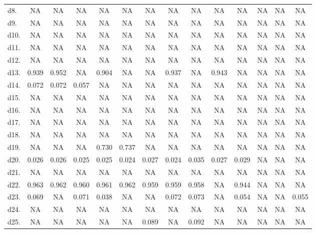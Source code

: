 \begin{table}
\begin{tabular}{lccccccccccccc}
d8.   & NA    & NA    & NA    & NA    & NA    & NA    & NA    & NA    & NA    & NA    & NA    & NA    & NA \\
d9.   & NA    & NA    & NA    & NA    & NA    & NA    & NA    & NA    & NA    & NA    & NA    & NA    & NA \\
d10.  & NA    & NA    & NA    & NA    & NA    & NA    & NA    & NA    & NA    & NA    & NA    & NA    & NA \\
d11.  & NA    & NA    & NA    & NA    & NA    & NA    & NA    & NA    & NA    & NA    & NA    & NA    & NA \\
d12.  & NA    & NA    & NA    & NA    & NA    & NA    & NA    & NA    & NA    & NA    & NA    & NA    & NA \\
d13.  & 0.939 & 0.952 & NA    & 0.904 & NA    & NA    & 0.937 & NA    & 0.943 & NA    & NA    & NA    & NA \\
d14.  & 0.072 & 0.072 & 0.057 & NA    & NA    & NA    & NA    & NA    & NA    & NA    & NA    & NA    & NA \\
d15.  & NA    & NA    & NA    & NA    & NA    & NA    & NA    & NA    & NA    & NA    & NA    & NA    & NA \\
d16.  & NA    & NA    & NA    & NA    & NA    & NA    & NA    & NA    & NA    & NA    & NA    & NA    & NA \\
d17.  & NA    & NA    & NA    & NA    & NA    & NA    & NA    & NA    & NA    & NA    & NA    & NA    & NA \\
d18.  & NA    & NA    & NA    & NA    & NA    & NA    & NA    & NA    & NA    & NA    & NA    & NA    & NA \\
d19.  & NA    & NA    & NA    & 0.730 & 0.737 & NA    & NA    & NA    & NA    & NA    & NA    & NA    & NA \\
d20.  & 0.026 & 0.026 & 0.025 & 0.025 & 0.024 & 0.027 & 0.024 & 0.035 & 0.027 & 0.029 & NA    & NA    & NA \\
d21.  & NA    & NA    & NA    & NA    & NA    & NA    & NA    & NA    & NA    & NA    & NA    & NA    & NA \\
d22.  & 0.963 & 0.962 & 0.960 & 0.961 & 0.962 & 0.959 & 0.959 & 0.958 & NA    & 0.944 & NA    & NA    & NA \\
d23.  & 0.069 & NA    & 0.071 & 0.038 & NA    & NA    & 0.072 & 0.073 & NA    & 0.054 & NA    & NA    & 0.055 \\
d24.  & NA    & NA    & NA    & NA    & NA    & NA    & NA    & NA    & NA    & NA    & NA    & NA    & NA \\
d25.  & NA    & NA    & NA    & NA    & NA    & 0.089 & NA    & 0.092 & NA    & NA    & NA    & NA    & NA \\

\end{tabular}
\end{table}
